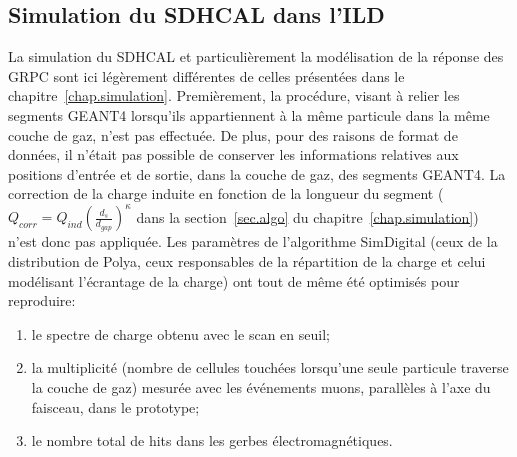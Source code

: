 \subsection{Simulation du SDHCAL dans l'ILD}
\label{sec.ildSDHCALSIM}
La simulation du SDHCAL et particulièrement la modélisation de la réponse des GRPC sont ici légèrement différentes de celles présentées dans le chapitre~\ref{chap.simulation}. Premièrement, la procédure, visant à relier les segments GEANT4 lorsqu'ils appartiennent à la même particule dans la même couche de gaz, n'est pas effectuée. De plus, pour des raisons de format de données, il n'était pas possible de conserver les informations relatives aux positions d'entrée et de sortie, dans la couche de gaz, des segments GEANT4. La correction de la charge induite en fonction de la longueur du segment ($Q_{corr}=Q_{ind}(\frac{d_s}{d_{gap}})^\kappa$ dans la section~\ref{sec.algo} du chapitre~\ref{chap.simulation}) n'est donc pas appliquée. Les paramètres de l'algorithme SimDigital (ceux de la distribution de Polya, ceux responsables de la répartition de la charge et celui modélisant l'écrantage de la charge) ont tout de même été optimisés pour reproduire:
\begin{enumerate}[-]
\item le spectre de charge obtenu avec le scan en seuil;
\item la multiplicité (nombre de cellules touchées lorsqu'une seule particule traverse la couche de gaz) mesurée avec les événements muons, parallèles à l'axe du faisceau, dans le prototype;
\item le nombre total de hits dans les gerbes électromagnétiques.
\end{enumerate}

